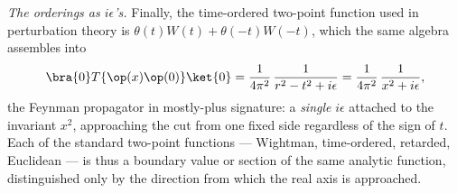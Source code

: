 \begin{eexample}
\emph{The orderings as $i\epsilon$'s.} Finally, the time-ordered two-point
function used in perturbation theory is $\theta(t)W(t) + \theta(-t)W(-t)$,
which the same algebra assembles into
\begin{equation}
\bra{0} T\{\op(x)\op(0)\}\ket{0} = \frac{1}{4\pi^2}\,
\frac{1}{r^2 - t^2 + i\epsilon} = \frac{1}{4\pi^2}\,\frac{1}{x^2 + i\epsilon},
\end{equation}
the Feynman propagator in mostly-plus signature: a \emph{single} $i\epsilon$
attached to the invariant $x^2$, approaching the cut from one fixed side
regardless of the sign of $t$. Each of the standard two-point functions ---
Wightman, time-ordered, retarded, Euclidean --- is thus a boundary value or
section of the same analytic function, distinguished only by the direction
from which the real axis is approached.
\end{eexample}

